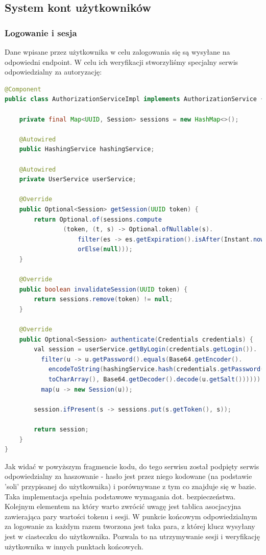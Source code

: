 \documentclass{report}
\begin{document}
		\subsection{System kont użytkowników}
		
			\subsubsection{Logowanie i sesja}

			Dane wpisane przez użytkownika w celu zalogowania się są wysyłane na odpowiedni endpoint. W celu ich weryfikacji stworzyliśmy specjalny serwis odpowiedzialny za autoryzację:

\begin{lstlisting}[language=Java, breaklines]		
@Component
public class AuthorizationServiceImpl implements AuthorizationService {

    private final Map<UUID, Session> sessions = new HashMap<>();

    @Autowired
    public HashingService hashingService;

    @Autowired
    private UserService userService;

    @Override
    public Optional<Session> getSession(UUID token) {
        return Optional.of(sessions.compute
        		(token, (t, s) -> Optional.ofNullable(s).
                    filter(es -> es.getExpiration().isAfter(Instant.now())).
                    orElse(null)));
    }

    @Override
    public boolean invalidateSession(UUID token) {
        return sessions.remove(token) != null;
    }

    @Override
    public Optional<Session> authenticate(Credentials credentials) {
        val session = userService.getByLogin(credentials.getLogin()).
          filter(u -> u.getPassword().equals(Base64.getEncoder().
            encodeToString(hashingService.hash(credentials.getPassword().
            toCharArray(), Base64.getDecoder().decode(u.getSalt()))))).
          map(u -> new Session(u));

        session.ifPresent(s -> sessions.put(s.getToken(), s));

        return session;
    }
}	
\end{lstlisting}

Jak widać w powyższym fragmencie kodu, do tego serwisu został podpięty serwis odpowiedzialny za haszowanie - hasło jest przez niego kodowane (na podstawie 'soli' przypisanej do użytkownika) i porównywane z tym co znajduje się w bazie. Taka implementacja spełnia podstawowe wymagania dot. bezpieczeństwa. Kolejnym elementem na który warto zwrócić uwagę jest tablica asocjacyjna zawierająca pary wartości tokenu i sesji. W punkcie końcowym odpowiedzialnym za logowanie za każdym razem tworzona jest taka para, z której klucz wysyłany jest w ciasteczku do użytkownika. Pozwala to na utrzymywanie sesji i weryfikację użytkownika w innych punktach końcowych.
			
\end{document}
